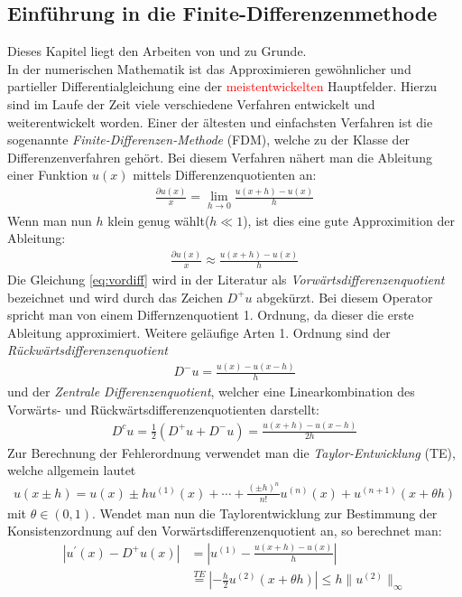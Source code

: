 \documentclass[a4paper,11pt]{article}
\newcommand{\col}[2][red]{\textcolor{#1}{#2}}
\begin{document}
\subsection{Einführung in die Finite-Differenzenmethode}
Dieses Kapitel liegt den Arbeiten von \cite{burger2006numerik} und \cite{braess2013finite} zu Grunde.\\
In der numerischen Mathematik ist das Approximieren gewöhnlicher und partieller Differentialgleichung eine der \col{meistentwickelten} Hauptfelder. Hierzu sind im Laufe der Zeit viele verschiedene Verfahren entwickelt und weiterentwickelt worden. Einer der ältesten  und einfachsten Verfahren ist die sogenannte \textit{Finite-Differenzen-Methode} (FDM), welche zu der Klasse der Differenzenverfahren gehört. Bei diesem Verfahren nähert man die Ableitung einer Funktion $u(x)$ mittels Differenzenquotienten an:
\begin{align}
 \frac{\partial u(x)}{x}=\lim\limits_{h \rightarrow 0} \frac{u(x+h)-u(x)}{h}
\end{align}
Wenn man nun $h$ klein genug wählt($h\ll1$), ist dies eine gute Approximition der Ableitung:
\begin{align}
 \frac{\partial u(x)}{x}\approx \frac{u(x+h)-u(x)}{h}\label{eq:vordiff}
\end{align}
Die Gleichung \eqref{eq:vordiff} wird in der Literatur als \textit{Vorwärtsdifferenzenquotient} bezeichnet und wird durch das Zeichen $D^+u$ abgekürzt. Bei diesem Operator spricht man von einem Differnzenquotient 1. Ordnung, da dieser die erste Ableitung approximiert. Weitere geläufige Arten 1. Ordnung sind der \textit{Rückwärtsdifferenzenquotient}
\begin{align}
 D^-u= \frac{u(x)-u(x-h)}{h}
\end{align}
und der \textit{Zentrale Differenzenquotient}, welcher eine Linearkombination des Vorwärts- und Rückwärtsdifferenzenquotienten darstellt:
\begin{align}
 D^cu=\frac{1}{2}(D^+u+D^-u)= \frac{u(x+h)-u(x-h)}{2h}
\end{align}
Zur Berechnung der Fehlerordnung verwendet man die \textit{Taylor-Entwicklung} (TE), welche allgemein lautet
\begin{align}
 u(x\pm h)=u(x)\pm hu^{(1)}(x)+\cdots+\frac{(\pm h)^n}{n!}u^{(n)}(x)+u^{(n+1)}(x+\theta h)
\end{align}
mit $\theta\in(0,1)$.
Wendet man nun die Taylorentwicklung zur Bestimmung der Konsistenzordnung auf den Vorwärtsdifferenzenquotient an, so berechnet man:
\begin{align}
 |u^{'}(x)-D^+u(x)|&=|u^{(1)}-\frac{u(x+h)-u(x)}{h}|\nonumber\\&\overset{TE}{=}|-\frac{h}{2}u^{(2)}(x+\theta h)|\le h\|u^{(2)}\|_{\infty}
\end{align}
\end{document}
